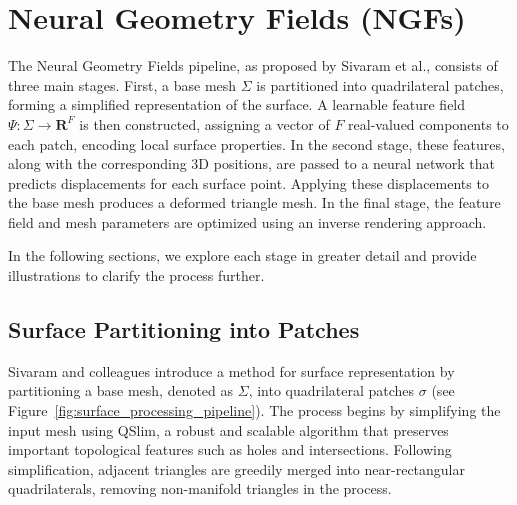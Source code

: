 \section{Neural Geometry Fields (NGFs)}\label{Sec:MainPart}

The Neural Geometry Fields pipeline, as proposed by Sivaram et al., consists of three main stages.  
First, a base mesh $\Sigma$ is partitioned into quadrilateral patches, forming a simplified representation of the surface.  
A learnable feature field $\Psi: \Sigma \rightarrow \mathbf{R}^F$ is then constructed, assigning a vector of $F$ real-valued components to each patch, encoding local surface properties.  
In the second stage, these features, along with the corresponding 3D positions, are passed to a neural network that predicts displacements for each surface point.  
Applying these displacements to the base mesh produces a deformed triangle mesh.  
In the final stage, the feature field and mesh parameters are optimized using an inverse rendering approach.  

In the following sections, we explore each stage in greater detail and provide illustrations to clarify the process further.

\subsection{Surface Partitioning into Patches}

Sivaram and colleagues introduce a method for surface representation by partitioning a base mesh, denoted as $\Sigma$, into quadrilateral patches $\sigma$ (see Figure~\ref{fig:surface_processing_pipeline}).  
The process begins by simplifying the input mesh using QSlim, a robust and scalable algorithm that preserves important topological features such as holes and intersections.  
Following simplification, adjacent triangles are greedily merged into near-rectangular quadrilaterals, removing non-manifold triangles in the process.  

